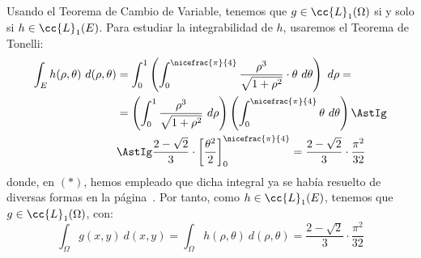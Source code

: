 \begin{ejercicio}
    Usando el Teorema de Cambio de Variable, tenemos que $g\in \cc{L}_1(\Omega)$ si y solo si $h\in \cc{L}_1(E)$. Para estudiar la integrabilidad de $h$, usaremos el Teorema de Tonelli:
    \begin{align*}
        \int_E h(\rho, \theta)~d(\rho, \theta) &=
        \int_0^1 \left( \int_0^{\nicefrac{\pi}{4}} \dfrac{\rho^3}{\sqrt{1+\rho^2}}\cdot \theta~d\theta \right)~d\rho =\\
        &= \left( \int_0^1 \dfrac{\rho^3}{\sqrt{1+\rho^2}} ~d\rho \right) \left( \int_0^{\nicefrac{\pi}{4}} \theta~d\theta \right)
        \AstIg\\&\AstIg \dfrac{2-\sqrt{2}}{3}\cdot \left[\dfrac{\theta^2}{2}\right]_0^{\nicefrac{\pi}{4}}
        = \dfrac{2-\sqrt{2}}{3}\cdot \dfrac{\pi^2}{32}
    \end{align*}
    donde, en $(\ast)$, hemos empleado que dicha integral ya se había resuelto de diversas formas en la página~\pageref{desc:optInt}.
    Por tanto, como $h\in \cc{L}_1(E)$, tenemos que $g\in \cc{L}_1(\Omega)$, con:
    \begin{equation*}
        \int_{\Omega} g(x, y)~d(x, y) = \int_{\Omega} h(\rho, \theta)~d(\rho, \theta) = \dfrac{2-\sqrt{2}}{3}\cdot \dfrac{\pi^2}{32}
    \end{equation*}
\end{ejercicio}


